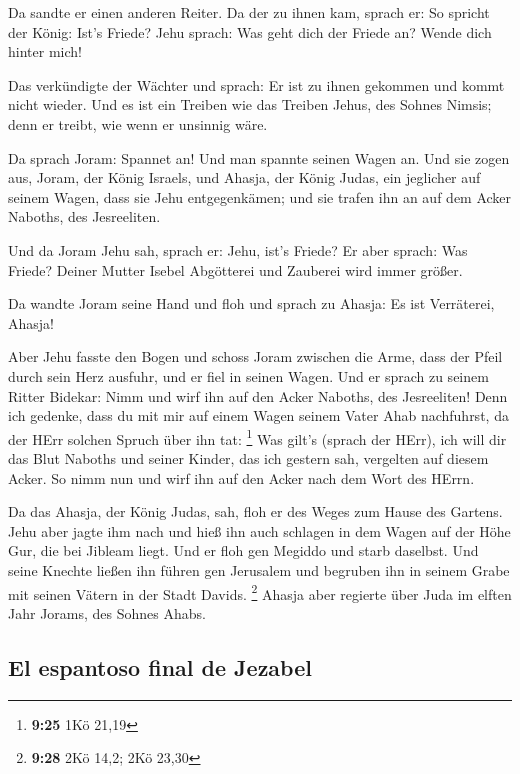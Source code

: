  Da sandte er einen anderen Reiter. Da der zu ihnen kam,
sprach er: So spricht der König: Ist's Friede? Jehu sprach: Was geht
dich der Friede an? Wende dich hinter mich!

 Das verkündigte der Wächter und sprach: Er ist zu ihnen
gekommen und kommt nicht wieder. Und es ist ein Treiben wie das Treiben
Jehus, des Sohnes Nimsis; denn er treibt, wie wenn er unsinnig wäre.

 Da sprach Joram: Spannet an! Und man spannte seinen
Wagen an. Und sie zogen aus, Joram, der König Israels, und Ahasja, der
König Judas, ein jeglicher auf seinem Wagen, dass sie Jehu
entgegenkämen; und sie trafen ihn an auf dem Acker Naboths, des
Jesreeliten.

 Und da Joram Jehu sah, sprach er: Jehu, ist's Friede? Er
aber sprach: Was Friede? Deiner Mutter Isebel Abgötterei und Zauberei
wird immer größer.

 Da wandte Joram seine Hand und floh und sprach zu
Ahasja: Es ist Verräterei, Ahasja!

 Aber Jehu fasste den Bogen und schoss Joram zwischen die
Arme, dass der Pfeil durch sein Herz ausfuhr, und er fiel in seinen
Wagen.  Und er sprach zu seinem Ritter Bidekar: Nimm und
wirf ihn auf den Acker Naboths, des Jesreeliten! Denn ich gedenke, dass
du mit mir auf einem Wagen seinem Vater Ahab nachfuhrst, da der HErr
solchen Spruch über ihn tat: \footnote{\textbf{9:25} 1Kö 21,19}
 Was gilt's (sprach der HErr), ich will dir das Blut
Naboths und seiner Kinder, das ich gestern sah, vergelten auf diesem
Acker. So nimm nun und wirf ihn auf den Acker nach dem Wort des HErrn.

 Da das Ahasja, der König Judas, sah, floh er des Weges
zum Hause des Gartens. Jehu aber jagte ihm nach und hieß ihn auch
schlagen in dem Wagen auf der Höhe Gur, die bei Jibleam liegt. Und er
floh gen Megiddo und starb daselbst.  Und seine Knechte
ließen ihn führen gen Jerusalem und begruben ihn in seinem Grabe mit
seinen Vätern in der Stadt Davids. \footnote{\textbf{9:28} 2Kö 14,2; 2Kö
  23,30}  Ahasja aber regierte über Juda im elften Jahr
Jorams, des Sohnes Ahabs.

\hypertarget{el-espantoso-final-de-jezabel}{%
\subsection{El espantoso final de
Jezabel}\label{el-espantoso-final-de-jezabel}}

